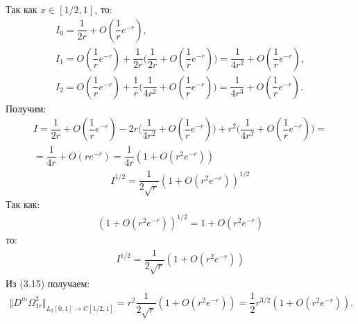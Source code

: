 Так как $ x \in [1/2, 1] $, то:
\begin{equation}
\begin{array}{c}
\nonumber

I_0 = \dfrac{1}{2r} + O(\dfrac{1}{r}e^{-r}), \\
I_1 = O(\dfrac{1}{r}e^{-r}) + \dfrac{1}{2r}\biggl( \dfrac{1}{2r} + O(\dfrac{1}{r}e^{-r}) \biggr) = \dfrac{1}{4r^2} + O(\dfrac{1}{r}e^{-r}), \\
I_2 = O(\dfrac{1}{r}e^{-r}) + \dfrac{1}{r}\biggl( \dfrac{1}{4r^2} + O(\dfrac{1}{r}e^{-r}) \biggr) = \dfrac{1}{4r^3} + O(\dfrac{1}{r}e^{-r}).

\end{array}
\end{equation}
Получим:
\begin{equation}
\begin{array}{c}
\nonumber

I = \dfrac{1}{2r} + O(\dfrac{1}{r}e^{-r}) - 2r\biggl( \dfrac{1}{4r^2} + O(\dfrac{1}{r}e^{-r}) \biggr) + r^2\biggl( \dfrac{1}{4r^3} + O(\dfrac{1}{r}e^{-r}) \biggr) = \\ = \dfrac{1}{4r} + O(re^{-r}) = \dfrac{1}{4r}(1 + O(r^2e^{-r}))

\end{array}
\end{equation}  
\begin{equation}
\begin{array}{c}
\nonumber

I^{1/2} = \dfrac{1}{2\sqrt{r}}(1 + O(r^2e^{-r}))^{1/2}

\end{array}
\end{equation}  
Так как:
\begin{equation}
\begin{array}{c}
\nonumber

(1 + O(r^2e^{-r}))^{1/2} = 1 + O(r^2e^{-r})

\end{array}
\end{equation}  
то:
\begin{equation}
\begin{array}{c}
\nonumber

I^{1/2} = \dfrac{1}{2\sqrt{r}}(1 + O(r^2e^{-r}))

\end{array}
\end{equation}
Из (3.15) получаем:
\begin{equation}
\begin{array}{c}
\nonumber

\Vert D^m \Omega_{1r}^2 \Vert_{L_2[0,1] \rightarrow C[1/2,1]} = r^2\dfrac{1}{2\sqrt{r}}(1 + O(r^2e^{-r})) = \dfrac{1}{2} r^{3/2}(1 + O(r^2e^{-r})).

\end{array}
\end{equation}

